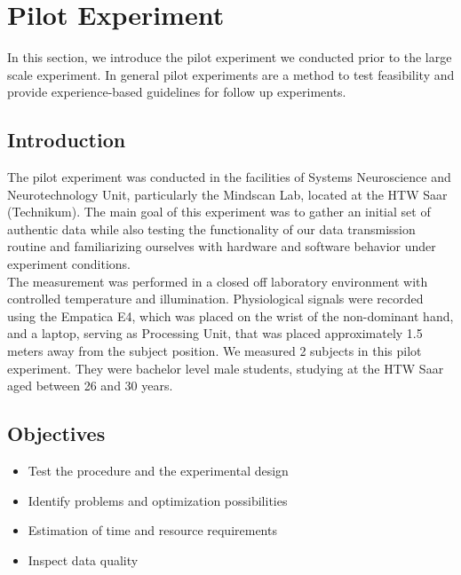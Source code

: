 \section{Pilot Experiment}\label{pilot}
In this section, we introduce the pilot experiment we conducted prior to the large scale experiment. In general pilot experiments are a method to test feasibility and provide experience-based guidelines for follow up experiments. 
\subsection{Introduction}
The pilot experiment was conducted in the facilities of Systems Neuroscience and Neurotechnology Unit, particularly the Mindscan Lab, located at the HTW Saar (Technikum). The main goal of this experiment was to gather an initial set of authentic data while also testing the functionality of our data transmission routine and familiarizing ourselves with hardware and software behavior under experiment conditions. \\
The measurement was performed in a closed off laboratory environment with controlled temperature and illumination. Physiological signals were recorded using the Empatica E4, which was placed on the wrist of the non-dominant hand, and a laptop, serving as Processing Unit, that was placed approximately 1.5 meters away from the subject position.
We measured 2 subjects in this pilot experiment. They were bachelor level male students, studying at the HTW Saar aged between 26 and 30 years.

\subsection{Objectives}
\begin{itemize}
\item Test the procedure and the experimental design
\item Identify problems and optimization possibilities
\item Estimation of time and resource requirements
\item Inspect data quality
\end{itemize}
